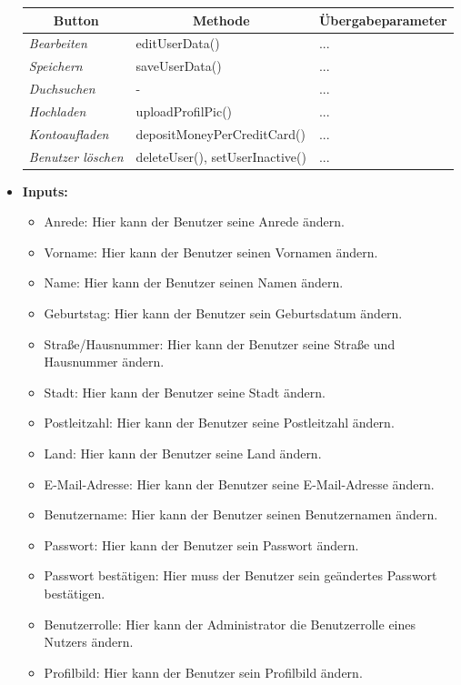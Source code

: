 \begin{itemize}
					\begin{center}
						\begin{longtable}{|p{4cm} |p{6cm} | p{4cm}|}
							
							\hline \multicolumn{1}{|c|}{\textbf{Button}} & \multicolumn{1}{|c|}{\textbf{Methode}} & \multicolumn{1}{|c|}{\textbf{\"{U}bergabeparameter}} \\ \hline
							\endfirsthead
							\hline
							\endlastfoot
							
							\textit{Bearbeiten } & editUserData() & ... \\ \hline
							\textit{Speichern } & saveUserData() & ... \\ \hline
							\textit{Duchsuchen } & - & ... \\ \hline
							\textit{Hochladen } & uploadProfilPic() & ... \\ \hline
							\textit{Kontoaufladen } & depositMoneyPerCreditCard() & ... \\ \hline
							\textit{Benutzer löschen} &  deleteUser(), setUserInactive()  & ... \\ \hline
						\end{longtable}
					\end{center}
				
			\item \textbf{Inputs:}
				\begin{itemize}
					\item Anrede: Hier kann der Benutzer seine Anrede ändern.
					\item Vorname: Hier kann der Benutzer seinen Vornamen ändern.
					\item Name: Hier kann der Benutzer seinen Namen ändern.
					\item Geburtstag: Hier kann der Benutzer sein Geburtsdatum ändern.
					\item Straße/Hausnummer: Hier kann der Benutzer seine Straße und Hausnummer ändern.
					\item Stadt: Hier kann der Benutzer seine Stadt ändern.
					\item Postleitzahl: Hier kann der Benutzer seine Postleitzahl ändern.
					\item Land: Hier kann der Benutzer seine Land ändern.
					\item E-Mail-Adresse: Hier kann der Benutzer seine E-Mail-Adresse ändern.
					\item Benutzername: Hier kann der Benutzer seinen Benutzernamen ändern.
					\item Passwort: Hier kann der Benutzer sein Passwort ändern.
					\item Passwort bestätigen: Hier muss der Benutzer sein geändertes Passwort bestätigen.
					\item Benutzerrolle: Hier kann der Administrator die Benutzerrolle eines Nutzers ändern.
					\item Profilbild: Hier kann der Benutzer sein Profilbild ändern.
				\end{itemize}
				

\end{itemize}
